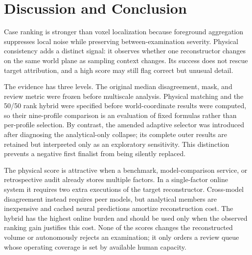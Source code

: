 \documentclass{article}
\begin{document}
\section{Discussion and Conclusion}
Case ranking is stronger than voxel localization because foreground aggregation suppresses local noise while preserving between-examination severity. Physical consistency adds a distinct signal: it observes whether one reconstructor changes on the same world plane as sampling context changes. Its success does not rescue target attribution, and a high score may still flag correct but unusual detail.

The evidence has three levels. The original median disagreement, mask, and review metric were frozen before multiscale analysis. Physical matching and the 50/50 rank hybrid were specified before world-coordinate results were computed, so their nine-profile comparison is an evaluation of fixed formulas rather than per-profile selection. By contrast, the amended adaptive selector was introduced after diagnosing the analytical-only collapse; its complete outer results are retained but interpreted only as an exploratory sensitivity. This distinction prevents a negative first finalist from being silently replaced.

The physical score is attractive when a benchmark, model-comparison service, or retrospective audit already stores multiple factors. In a single-factor online system it requires two extra executions of the target reconstructor. Cross-model disagreement instead requires peer models, but analytical members are inexpensive and cached neural predictions amortize reconstruction cost. The hybrid has the highest online burden and should be used only when the observed ranking gain justifies this cost. None of the scores changes the reconstructed volume or autonomously rejects an examination; it only orders a review queue whose operating coverage is set by available human capacity.

\begin{table}[H]
 \centering
 \caption{Operational interpretation. All signals are ground-truth-free at scoring time.}
 \label{tab:operations}
\end{table}
\end{document}
